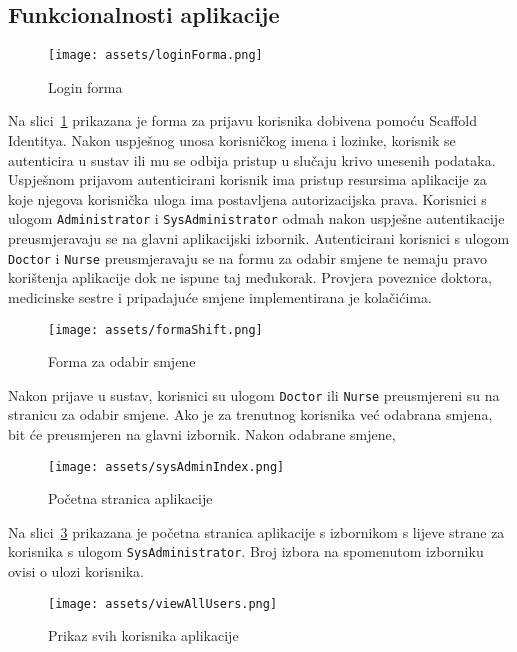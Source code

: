 \subsection{Funkcionalnosti aplikacije}

\begin{figure}[H]
	\texttt{[image: assets/loginForma.png]}
	\centering
	\caption{Login forma}
	\label{fig:loginForm}
\end{figure}

Na slici~\ref{fig:loginForm} prikazana je forma za prijavu korisnika dobivena pomoću Scaffold Identitya. Nakon uspješnog unosa korisničkog imena i lozinke, korisnik se autenticira u sustav ili mu se odbija pristup u slučaju krivo unesenih podataka. Uspješnom prijavom autenticirani korisnik ima pristup resursima aplikacije za koje njegova korisnička uloga ima postavljena autorizacijska prava. Korisnici s ulogom \texttt{Administrator} i \texttt{SysAdministrator} odmah nakon uspješne autentikacije preusmjeravaju se na glavni aplikacijski izbornik. Autenticirani korisnici s ulogom \texttt{Doctor} i \texttt{Nurse} preusmjeravaju se na formu za odabir smjene te nemaju pravo korištenja aplikacije dok ne ispune taj međukorak. Provjera poveznice doktora, medicinske sestre i pripadajuće smjene implementirana je kolačićima.

\begin{figure}[H]
	\texttt{[image: assets/formaShift.png]}
	\centering
	\caption{Forma za odabir smjene}
	\label{fig:shiftForm}
\end{figure}

Nakon prijave u sustav, korisnici su ulogom \texttt{Doctor} ili \texttt{Nurse} preusmjereni su na stranicu za odabir smjene. Ako je za trenutnog korisnika već odabrana smjena, bit će preusmjeren na glavni izbornik. Nakon odabrane smjene, 

\begin{figure}[H]
	\texttt{[image: assets/sysAdminIndex.png]}
	\centering
	\caption{Početna stranica aplikacije}
	\label{fig:homePage}
\end{figure}

Na slici~\ref{fig:homePage} prikazana je početna stranica aplikacije s izbornikom s lijeve strane za korisnika s ulogom \texttt{SysAdministrator}. Broj izbora na spomenutom izborniku ovisi o ulozi korisnika.

\begin{figure}[H]
	\texttt{[image: assets/viewAllUsers.png]}
	\centering
	\caption{Prikaz svih korisnika aplikacije}
	\label{fig:allUsers}
\end{figure}

